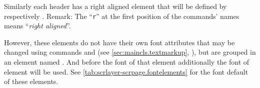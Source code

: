 Similarly each header has a right aligned element that will be defined by
 respectively . Remark: The ``\texttt{r}'' at the
first position of the commands' names means ``\emph{right aligned}''.

%
%
However, these elements do not have their own font attributes that may be
changed using commands  and  (see
\autoref{sec:maincls.textmarkup}, ),
but are grouped in an element named . And before the
font of that element additionally the font of element
 will be used. See
\autoref{tab:scrlayer-scrpage.fontelements} for the font default of these
elements.%
%
%

